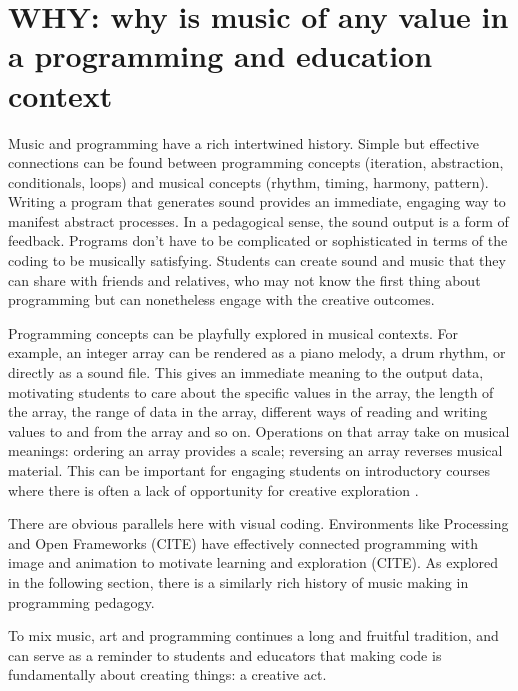 \section{WHY: why is music of any value in a programming and education context} \label{sec:why}

Music and programming have a rich intertwined history. Simple but effective connections can be found between programming concepts (iteration, abstraction, conditionals, loops) and musical concepts (rhythm, timing, harmony, pattern). Writing a program that generates sound provides an immediate, engaging way to manifest abstract processes. In a pedagogical sense, the sound output is a form of feedback. Programs don't have to be complicated or sophisticated in terms of the coding to be musically satisfying. Students can create sound and music that they can share with friends and relatives, who may not know the first thing about programming but can nonetheless engage with the creative outcomes. 


Programming concepts can be playfully explored in musical contexts. For example, an integer array can be rendered as a piano melody, a drum rhythm, or directly as a sound file. This gives an immediate meaning to the output data, motivating students to care about the specific values in the array, the length of the array, the range of data in the array, different ways of reading and writing values to and from the array and so on. Operations on that array take on musical meanings: ordering an array provides a scale; reversing an array reverses musical material. This can be important for engaging students on introductory courses where there is often a lack of opportunity for creative exploration \cite{sharmin_creativity_2021}.

There are obvious parallels here with visual coding. Environments like Processing \cite{reas2006processing} and Open Frameworks (CITE) have effectively connected programming with image and animation to motivate learning and exploration (CITE). As explored in the following section, there is a similarly rich history of music making in programming pedagogy.

To mix music, art and programming continues a long and fruitful tradition, and can serve as a reminder to students and educators that making code is fundamentally about creating things: a creative act.


